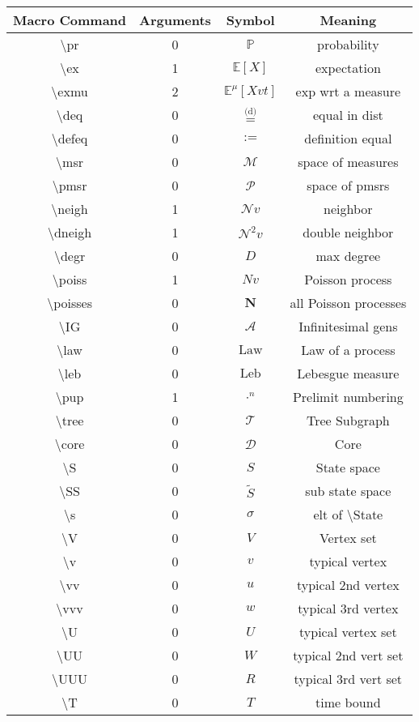 \documentclass[12pt]{article}
\newcommand{\mb}{\mathbb}
\newcommand{\mc}{\mathcal}
\newcommand{\te}{\text}
\newcommand{\tbs}{\textbackslash}
\newcommand{\pr}{\mb{P}}							%
\newcommand{\ex}[1]{\mb{E}\left[#1\right]}			%
\newcommand{\exmu}[2]{\mb{E}^{#1}\left[#2\right]}	%
\newcommand{\deq}{\overset{\text{(d)}}{=}}			%
\newcommand{\defeq}{:=}								%
\newcommand{\msr}{\mc{M}}							%
\newcommand{\pmsr}{\mc{P}}							%
\renewcommand{\v}{v}							%
\newcommand{\vv}{u}								%
\newcommand{\vvv}{w}							%
\renewcommand{\U}{U}							%
\newcommand{\UU}{W}								%
\newcommand{\UUU}{R}							%
\renewcommand{\S}{S}							%
\newcommand{\s}{\sigma}							%
\newcommand{\T}{T}								%
\renewcommand{\t}{t}							%
\newcommand{\X}{X}								%
\newcommand{\IG}{\mc{A}}						%
\newcommand{\neigh}{\mc{N}}						%
\newcommand{\dneigh}{\mc{N}^2}					%
\newcommand{\degr}{D}							%
\newcommand{\tree}{\mc{T}}						%
\newcommand{\sln}[1]{^{#1}}						%
\newcommand{\core}{\mc{D}}						%
\renewcommand{\SS}{\tilde{\S}}					%
\newcommand{\poisses}{\mathbf{N}}				%
\newcommand{\poiss}{N}							%
\newcommand{\leb}{\te{Leb}}						%
\newcommand{\m}{\mu}							%
\newcommand{\law}{\te{Law}}						%
\begin{document}
\begin{longtable}{c|c|c|c}
Macro Command & Arguments & Symbol & Meaning\\\hline
\tbs pr&0&\(\pr\)	& probability\\
\tbs ex&1&\(\ex{X}\)	&expectation\\
\tbs exmu&2&\(\exmu{\m{}{}{}}{\X{\v}{\t}}\)	&exp wrt a measure\\
\tbs deq&0&\(\deq\)		&equal in dist\\
\tbs defeq&0&\(\defeq\)							&definition equal\\
\tbs msr&0&\(\msr\)							&space of measures\\
\tbs pmsr&0&\(\pmsr\)						&space of pmsrs\\
\tbs neigh&1&\(\neigh{\v}\)				&neighbor\\
\tbs dneigh&1&\(\dneigh{\v}\)				&double neighbor\\
\tbs degr&0&\(\degr\)								&max degree\\
\tbs poiss&1&\(\poiss{\v}\)						&Poisson process\\
\tbs poisses&0&\(\poisses\)					&all Poisson processes\\
\tbs IG&0&\(\IG\)					&Infinitesimal gens\\
\tbs law&0&\(\law\)							&Law of a process\\
\tbs leb&0&\(\leb\)							&Lebesgue measure\\
\tbs pup&1&\(\cdot\sln{n}\)						&Prelimit numbering\\
\tbs tree&0&\(\tree\)							&Tree Subgraph\\
\tbs core&0&\(\core\)							&Core\\
\tbs S&0&\(\S\)							&State space\\
\tbs SS&0&\(\SS\)						&sub state space\\
\tbs s&0&\(\s\)								&elt of \tbs State\\
\tbs V&0&\( V\)									&Vertex set\\
\tbs v&0&\(\v\)								&typical vertex\\
\tbs vv&0&\(\vv\)									&typical 2nd vertex\\
\tbs vvv&0&\(\vvv\)								&typical 3rd vertex\\
\tbs U&0&\(\U\)									&typical vertex set\\
\tbs UU&0&\(\UU\)								&typical 2nd vert set\\
\tbs UUU&0&\(\UUU\)								&typical 3rd vert set\\
\tbs T&0&\(\T\)									&time bound\\

\end{longtable}
\end{document}
